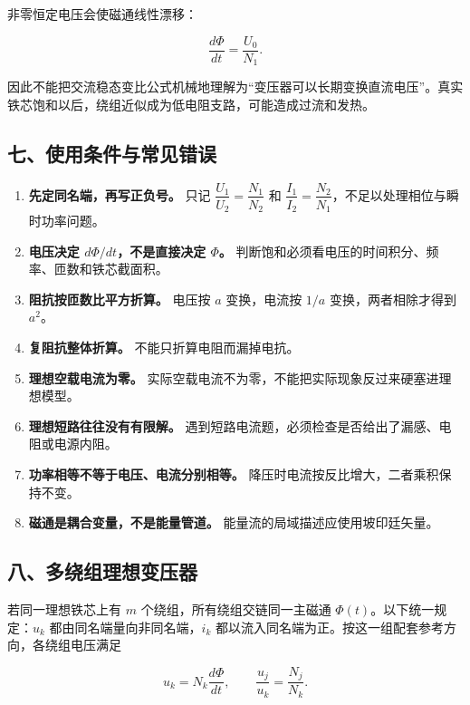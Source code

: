 非零恒定电压会使磁通线性漂移：

\[
\frac{d\Phi}{dt}=\frac{U_0}{N_1}.
\]

因此不能把交流稳态变比公式机械地理解为``变压器可以长期变换直流电压''。真实铁芯饱和以后，绕组近似成为低电阻支路，可能造成过流和发热。

\subsection{七、使用条件与常见错误}\label{m6:ux4e03ux4f7fux7528ux6761ux4ef6ux4e0eux5e38ux89c1ux9519ux8bef}

\begin{enumerate}
\def\labelenumi{\arabic{enumi}.}
\tightlist
\item
  \textbf{先定同名端，再写正负号。} 只记
  \(\dfrac{U_1}{U_2}=\dfrac{N_1}{N_2}\) 和
  \(\dfrac{I_1}{I_2}=\dfrac{N_2}{N_1}\)，不足以处理相位与瞬时功率问题。
\item
  \textbf{电压决定 \(d\Phi/dt\)，不是直接决定 \(\Phi\)。}
  判断饱和必须看电压的时间积分、频率、匝数和铁芯截面积。
\item
  \textbf{阻抗按匝数比平方折算。} 电压按 \(a\) 变换，电流按 \(1/a\)
  变换，两者相除才得到 \(a^2\)。
\item
  \textbf{复阻抗整体折算。} 不能只折算电阻而漏掉电抗。
\item
  \textbf{理想空载电流为零。}
  实际空载电流不为零，不能把实际现象反过来硬塞进理想模型。
\item
  \textbf{理想短路往往没有有限解。}
  遇到短路电流题，必须检查是否给出了漏感、电阻或电源内阻。
\item
  \textbf{功率相等不等于电压、电流分别相等。}
  降压时电流按反比增大，二者乘积保持不变。
\item
  \textbf{磁通是耦合变量，不是能量管道。}
  能量流的局域描述应使用坡印廷矢量。
\end{enumerate}

\subsection{八、多绕组理想变压器}\label{m6:ux516bux591aux7ed5ux7ec4ux7406ux60f3ux53d8ux538bux5668}

若同一理想铁芯上有 \(m\) 个绕组，所有绕组交链同一主磁通
\(\Phi(t)\)。以下统一规定：\(u_k\) 都由同名端量向非同名端，\(i_k\)
都以流入同名端为正。按这一组配套参考方向，各绕组电压满足

\[
\boxed{u_k=N_k\frac{d\Phi}{dt}},
\qquad
\boxed{\frac{u_j}{u_k}=\frac{N_j}{N_k}}.
\]

